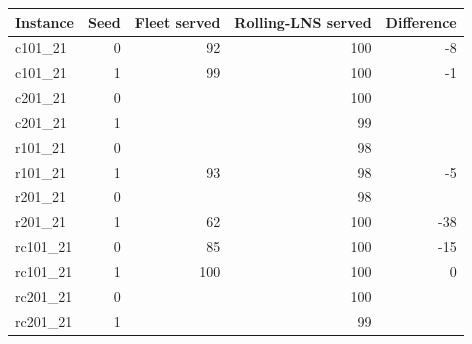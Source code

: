 \begin{tabular}{lrrrr}
\hline
Instance & Seed & Fleet served & Rolling-LNS served & Difference \\
\hline
c101\_21 & 0 & 92 & 100 & -8 \\
c101\_21 & 1 & 99 & 100 & -1 \\
c201\_21 & 0 &  & 100 &  \\
c201\_21 & 1 &  & 99 &  \\
r101\_21 & 0 &  & 98 &  \\
r101\_21 & 1 & 93 & 98 & -5 \\
r201\_21 & 0 &  & 98 &  \\
r201\_21 & 1 & 62 & 100 & -38 \\
rc101\_21 & 0 & 85 & 100 & -15 \\
rc101\_21 & 1 & 100 & 100 & 0 \\
rc201\_21 & 0 &  & 100 &  \\
rc201\_21 & 1 &  & 99 &  \\
\hline
\end{tabular}
